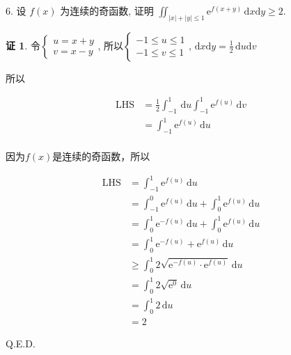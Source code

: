 \documentclass[a4paper,12pt]{article}
\theoremstyle{definition}
\newtheorem*{pf}{证}
\begin{document}
6. 设 $f(x)$ 为连续的奇函数, 证明 $\displaystyle\iint_{|x|+|y| \leq 1} \mathrm{e}^{f(x+y)}\,\mathrm{d}x\mathrm{d}y \geq 2$.
\begin{pf}
    令$\begin{cases}
            u=x+y \\
            v=x-y
        \end{cases}$, 所以$\begin{cases}
            -1\leq u\leq 1 \\
            -1\leq v\leq 1
        \end{cases}$, $\mathrm{d}x\mathrm{d}y=\frac{1}{2}\,\mathrm{d}u\mathrm{d}v$

    所以

    \begin{align*}
        \text{LHS}
         & =\frac{1}{2}\int_{-1}^1\,\mathrm{d}u\int_{-1}^1\mathrm{e}^{f(u)}\,\mathrm{d}v \\
         & =\int_{-1}^1\mathrm{e}^{f(u)}\,\mathrm{d}u                                    \\
    \end{align*}

    因为$f(x)$是连续的奇函数，所以

    \begin{align*}
        \text{LHS}
         & =\int_{-1}^1\mathrm{e}^{f(u)}\,\mathrm{d}u                                        \\
         & =\int_{-1}^0\mathrm{e}^{f(u)}\,\mathrm{d}u+\int_0^1\mathrm{e}^{f(u)}\,\mathrm{d}u \\
         & =\int_0^1\mathrm{e}^{-f(u)}\,\mathrm{d}u+\int_0^1\mathrm{e}^{f(u)}\,\mathrm{d}u   \\
         & =\int_0^1\mathrm{e}^{-f(u)}+\mathrm{e}^{f(u)}\,\mathrm{d}u                        \\
         & \geq\int_0^1 2\sqrt{\mathrm{e}^{-f(u)}\cdot\mathrm{e}^{f(u)}}\,\mathrm{d}u        \\
         & =\int_0^1 2\sqrt{\mathrm{e}^0}\,\mathrm{d}u                                       \\
         & =\int_0^1 2\,\mathrm{d}u                                                          \\
         & =2
    \end{align*}

    Q.E.D.
\end{pf}
\end{document}
